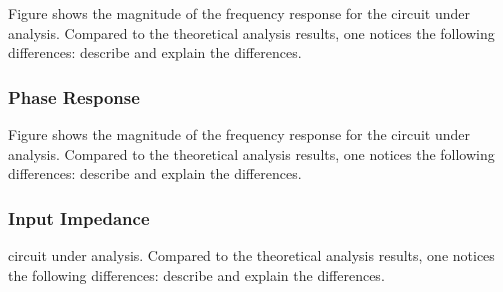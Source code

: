 Figure
shows the magnitude of the frequency response for the
circuit under analysis. Compared to the theoretical analysis results, one
notices the following differences: describe and explain the differences.



\subsubsection{Phase Response}

Figure
shows the magnitude of the frequency response for the
circuit under analysis. Compared to the theoretical analysis results, one
notices the following differences: describe and explain the differences.



\subsubsection{Input Impedance}

circuit under analysis. Compared to the theoretical analysis results, one
notices the following differences: describe and explain the differences.





